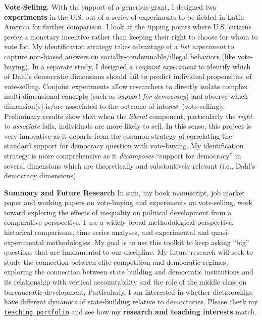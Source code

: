 \documentclass[10pt,stdletter,dateno,sigleft]{newlfm} %
\begin{document}
\begin{newlfm}
{\bf Vote-Selling.} With the support of a generous grant, I designed two {\bf experiments} in the U.S. out of a series of experiments to be fielded in Latin America for further comparison. I look at the tipping points where U.S. citizens prefer a monetary incentive rather than keeping their right to choose for whom to vote for. My identification strategy takes advantage of a \emph{list experiment} to capture non-biased answers on socially-condemnable/illegal behaviors (like vote-buying). In a separate study, I designed a \emph{conjoint experiment} to identify which of Dahl's democratic dimensions should fail to predict individual propensities of vote-selling. Conjoint experiments allow researchers to directly isolate complex multi-dimensional concepts (such as \emph{support for democracy}) and observe which dimension(s) is/are associated to the outcome of interest (vote-selling). Preliminary results show that when the \emph{liberal} component, particularly the \emph{right to associate} fails, individuals are more likely to sell. In this sense, this project is very innovative as it departs from the common strategy of correlating the standard support for democracy question with vote-buying. My identification strategy is more comprehensive as it \emph{decomposes} ``support for democracy'' in several dimensions which are theoretically and substantively relevant (i.e., Dahl's democracy dimensions). 


{\bf Summary and Future Research} In sum, my book manuscript, job market paper and working papers on vote-buying and experiments on vote-selling, work toward exploring the effects of inequality on political development from a comparative perspective. I use a widely broad methodological perspective, historical comparisons, time series analyses, and experimental and quasi-experimental methodologies. My goal is to use this toolkit to keep asking ``big'' questions that are fundamental to our discipline. My future research will seek to study the connection between elite competition and democratic regimes, exploring the connection between state building and democratic institutions and its relationship with vertical accountability and the role of the middle class on bureaucratic development. Particularly, I am interested in whether dictatorships have different dynamics of state-building relative to democracies. Please check my \href{http://www.hectorbahamonde.com/teaching/}{\texttt{teaching portfolio}} and see how my {\bf research and teaching interests} match.


{\unskip}


\vspace{-10cm}



\end{newlfm}
\end{document}
